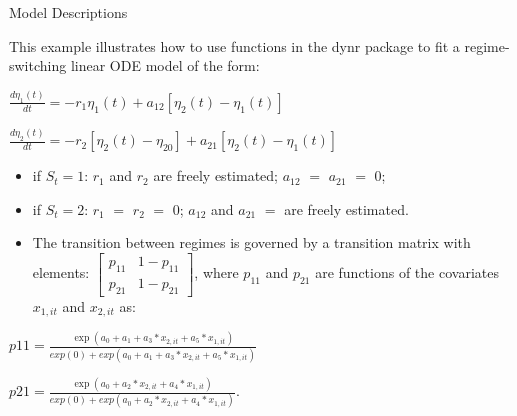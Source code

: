 \begin{frame}{Model Descriptions}

This example illustrates how to use functions in the dynr package to fit
a regime-switching linear ODE model of the form:

\(\frac{d\eta_1(t)}{dt} = -r_1\eta_1(t) + a_{12}[\eta_2(t)-\eta_1(t)]\)

\(\frac{d\eta_2(t)}{dt} = -r_2[\eta_2(t)-\eta_{20}] + a_{21}[\eta_2(t)-\eta_1(t)]\)

\begin{itemize}
\itemsep1pt\parskip0pt
\item
  if \(S_t=1\): \(r_1\) and \(r_2\) are freely estimated; \(a_{12}\)
  \(=\) \(a_{21}\) \(=\) 0;
\item
  if \(S_t=2\): \(r_1\) \(=\) \(r_2\) \(=\) 0; \(a_{12}\) and \(a_{21}\)
  \(=\) are freely estimated.
\item
  The transition between regimes is governed by a transition matrix with
  elements:
  \(\begin{bmatrix} p_{11} & 1 - p_{11}\\ p_{21} & 1 - p_{21} \end{bmatrix}\),
  where \(p_{11}\) and \(p_{21}\) are functions of the covariates
  \(x_{1,it}\) and \(x_{2,it}\) as:
\end{itemize}

\(p11 = \frac{\exp(a_0 + a_1 + a_3*x_{2,it}+a_5*x_{1,it})}{exp(0)+exp(a_0 +a_1 + a_3*x_{2,it}+a_5*x_{1,it})}\)

\(p21 = \frac{\exp(a_0 + a_2*x_{2,it}+a_4*x_{1,it})}{exp(0)+exp(a_0 + a_2*x_{2,it}+a_4*x_{1,it})}.\)

\end{frame}

